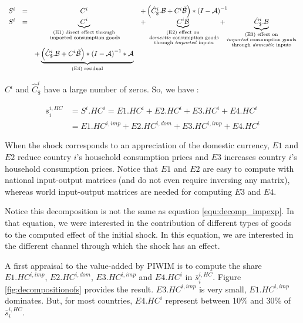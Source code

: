 \documentclass[11pt,a4paper]{article}
\begin{document}
\begin{equation}
\begin{array}{lccl}
	S^ i&=&C^i	&+ \left(\hat{C}^i_\$.{\cal B}+{C^i}{\tilde{{\cal B}}}\right)*{{(I-{\cal A})}^{-1}} \\
	S^i &=&\underbrace{C^i}_{\substack{\text{(E1) direct effect through} \\ \text{ imported consumption goods}}}&+ \underbrace{{C^i}{\tilde{{\cal B}}}}_{\substack{\text{(E2) effect on} \\ \text{ \emph{domestic} consumption goods} \\ \text{ through \emph{imported} inputs}}}  + \underbrace{\hat{C}^i_\$.{\cal B}}_{\substack{\text{(E3)  effect on} \\ \text{\emph{imported} consumption goods} \\ \text{through \emph{domestic} inputs}}} \\ &&+\underbrace {\left( \hat{C}^i_\$.{\cal B} + {C^i}{\tilde{{\cal B}}}\right)*{{(I-{\cal A})}^{-1}}*{\cal A}}_{\text{(E4) residual}} \\
\end{array}
\end{equation}


$C^i$ and $\hat{C}^i_\$$ have a large number of zeros. So, we have :

\begin{equation}
\begin{array}{lccl}
\overline{s}_{i}^{i,HC}&=S^i.HC^i=E1.HC^i+E2.HC^i+E3.HC^i+E4.HC^i \\
&=E1.HC^{i,imp}+E2.HC^{i,dom}+E3.HC^{i,imp}+E4.HC^i
 \end{array} 
 \end{equation}
 
When the shock corresponds to an appreciation of the domestic currency, $E1$ and $E2$ reduce country $i$'s household consumption prices and $E3$ increases country $i$'s household consumption prices. Notice that $E1$ and $E2$ are easy to compute with national input-output matrices (and do not even require inversing any matrix), whereas world input-output matrices are needed for computing $E3$ and $E4$.
 
Notice this decomposition is not the same as equation \ref{equ:decomp_impexp}. In that equation, we were interested in the contribution of different types of goods to the computed effect of the initial shock. In this equation, we are interested in the different channel through which the shock has an effect.


A first appraisal to the value-added by PIWIM is to compute the share $E1.HC^{i,imp}$, $E2.HC^{i,dom}$, $E3.HC^{i,imp}$ and $E4.HC^i$ in $\overline{s}_{i}^{i,HC}$. Figure \ref{fig:decompositionofs} provides the result. $E3.HC^{i,imp}$ is very small, $E1.HC^{i,imp}$ dominates. But, for most countries, $E4.HC^i$ represent between 10\% and 30\% of $\overline{s}_{i}^{i,HC}$.
\end{document}
